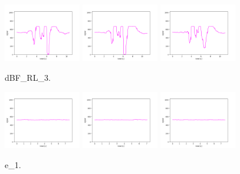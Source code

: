 \begin{figure}[!ht]
\begin{center}
\includegraphics[width=0.3\textwidth]{../data/dBF_RL_3/dBF_RL_3_1.png}
\includegraphics[width=0.3\textwidth]{../data/dBF_RL_3/dBF_RL_3_2.png}
\includegraphics[width=0.3\textwidth]{../data/dBF_RL_3/dBF_RL_3_3.png}
\caption{dBF\_RL\_3.\label{fig:dBF_RL_3}}
\end{center}
\end{figure}

\begin{figure}[!ht]
\begin{center}
\includegraphics[width=0.3\textwidth]{../data/e_1/e_1_1.png}
\includegraphics[width=0.3\textwidth]{../data/e_1/e_1_2.png}
\includegraphics[width=0.3\textwidth]{../data/e_1/e_1_3.png}
\caption{e\_1.\label{fig:e_1}}
\end{center}
\end{figure}

